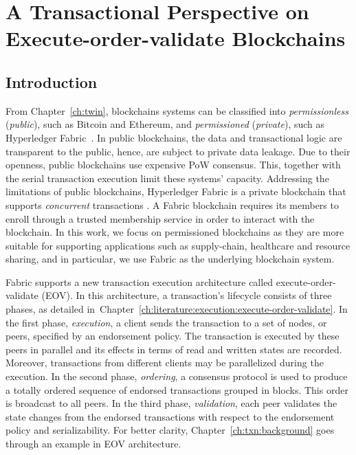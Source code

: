 \chapter{A Transactional Perspective on \\Execute-order-validate Blockchains}
\label{ch:txn}
\section{Introduction}
\label{ch:txn:intro}
From Chapter~\ref{ch:twin}, blockchains systems can be classified into \textit{permissionless}
(\textit{public}), such as Bitcoin and Ethereum, and \textit{permissioned}
(\textit{private}), such as Hyperledger Fabric~\cite{androulaki2018hyperledger}.
%
In public blockchains, the data and transactional logic are transparent to the
public, hence, are subject to private data leakage.
%
Due to their openness, public blockchains use expensive PoW consensus.
%
This, together with the serial transaction execution limit these systems' capacity.
%
Addressing the limitations of public blockchains, Hyperledger Fabric is a
private blockchain that supports \emph{concurrent} transactions
\cite{androulaki2018hyperledger}.
%
A Fabric blockchain requires its members to enroll through a trusted membership service in order to interact with the blockchain.
In this work, we focus on permissioned blockchains as they are more suitable
for supporting applications such as supply-chain, healthcare and resource
sharing, and in particular, we use Fabric as the underlying blockchain system.

Fabric supports a new transaction execution architecture called
execute-order-validate (EOV).
%
In this architecture, a transaction's lifecycle consists of three phases, as detailed in~Chapter~\ref{ch:literature:execution:execute-order-validate}. In the
first phase, \textit{execution}, a client sends the transaction to a set of
nodes, or peers, specified by an endorsement policy.
%
The transaction is executed by these peers in parallel and its effects in terms
of read and written states are recorded.
%
Moreover, transactions from different clients may be parallelized during the
execution.
%
In the second phase, \textit{ordering}, a consensus protocol is used
to produce a totally ordered sequence of endorsed transactions grouped in
blocks.
%
This order is broadcast to all peers. In the third phase, \textit{validation},
each peer validates the state changes from the endorsed transactions with
respect to the endorsement policy and serializability.
%
For better clarity, Chapter~\ref{ch:txn:background} goes through an example in EOV architecture. 

